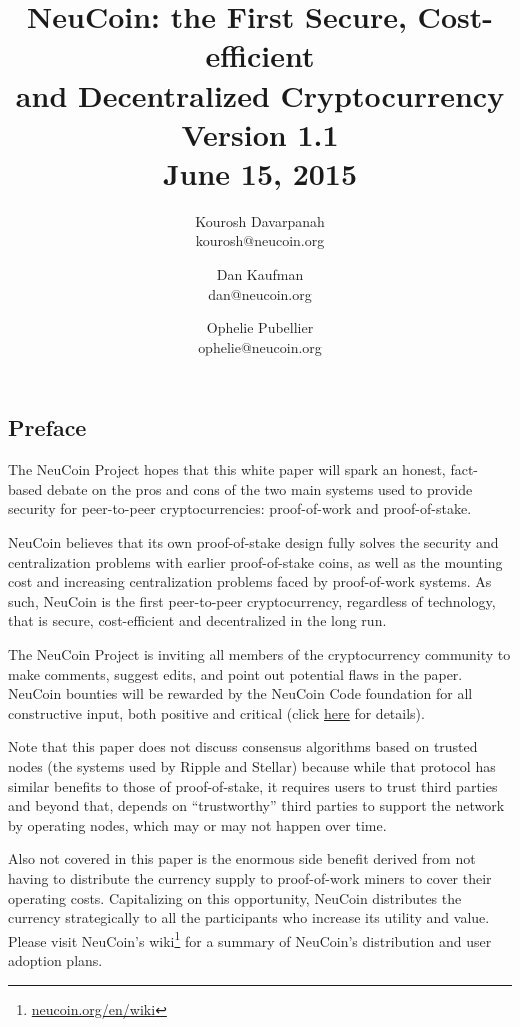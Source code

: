 \documentclass[a4paper,11pt]{article}
\title{\vspace{-5mm}NeuCoin: the First Secure, Cost-efficient\\ and Decentralized Cryptocurrency\\
  \vspace{8mm}
  \large Version 1.1\\ June 15, 2015\vspace{3mm}}
\author{
  Kourosh Davarpanah\\
  kourosh@neucoin.org
  \and
  Dan Kaufman\\
  dan@neucoin.org
  \and
  Ophelie Pubellier\\
  ophelie@neucoin.org
\vspace{3mm}}
\date{}
\begin{document}
\maketitle 


\subsection*{Preface}

The NeuCoin Project hopes that this white paper will spark an honest, fact-based debate on the pros and cons of the two main systems used to provide security for peer-to-peer cryptocurrencies: proof-of-work and proof-of-stake. 
 
NeuCoin believes that its own proof-of-stake design fully solves the security and centralization problems with earlier proof-of-stake coins, as well as the mounting cost and increasing centralization problems faced by proof-of-work systems. As such, NeuCoin is the first peer-to-peer cryptocurrency, regardless of technology, that is secure, cost-efficient and decentralized in the long run.

The NeuCoin Project is inviting all members of the cryptocurrency community to make comments, suggest edits, and point out potential flaws in the paper. NeuCoin bounties will be rewarded by the NeuCoin Code foundation for all constructive input, both positive and critical (click \href{http://www.neucoin.org/en/whitepaper/#bounty-program}{here} for details).

Note that this paper does not discuss consensus algorithms based on trusted nodes (the systems used by Ripple and Stellar) because while that protocol has similar benefits to those of proof-of-stake, it requires users to trust third parties and beyond that, depends on “trustworthy” third parties to support the network by operating nodes, which may or may not happen over time.

Also not covered in this paper is the enormous side benefit derived from not having to distribute the currency supply to proof-of-work miners to cover their operating costs. Capitalizing on this opportunity, NeuCoin distributes the currency strategically to all the participants who increase its utility and value. Please visit NeuCoin's wiki\footnote{\href{http://www.neucoin.org/en/wiki/}{neucoin.org/en/wiki}} for a summary of NeuCoin's distribution and user adoption plans.

\newpage
\end{document}
